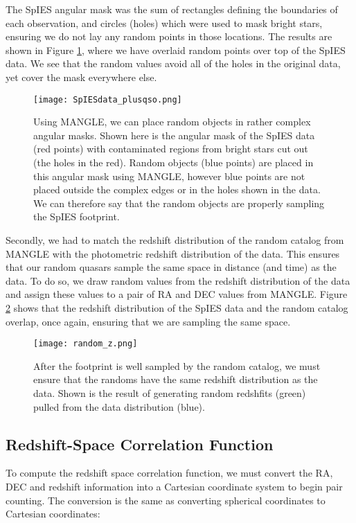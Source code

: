 \documentclass[onecolumn]{emulateapj}
\begin{document}
The SpIES angular mask was the sum of rectangles defining the boundaries of each observation, and circles (holes) which were used to mask bright stars, ensuring we do not lay any random points in those locations. The results are shown in Figure \ref{MANGLE}, where we have overlaid random points over top of the SpIES data. We see that the random values avoid all of the holes in the original data, yet cover the mask everywhere else.

\begin{figure}[!h]
	\centering
	\texttt{[image: SpIESdata\_plusqso.png]}
	\caption{\footnotesize{Using MANGLE, we can place random objects in rather complex angular masks. Shown here is the angular mask of the SpIES data (red points) with contaminated regions from bright stars cut out (the holes in the red). Random objects (blue points) are placed in this angular mask using MANGLE, however blue points are not placed outside the complex edges or in the holes shown in the data. We can therefore say that the random objects are properly sampling the SpIES footprint.}}
	\label{MANGLE}
\end{figure}

Secondly, we had to match the redshift distribution of the random catalog from MANGLE with the photometric redshift distribution of the data. This ensures that our random quasars sample the same space in distance (and time) as the data. To do so, we draw random values from the redshift distribution of the data and assign these values to a pair of RA and DEC values from MANGLE. Figure \ref{randz} shows that the redshift distribution of the SpIES data and the random catalog overlap, once again, ensuring that we are sampling the same space.


\begin{figure}[!h]
	\centering
	\texttt{[image: random\_z.png]}
	\caption{\footnotesize{After the footprint is well sampled by the random catalog, we must ensure that the randoms have the same redshift distribution as the data. Shown is the result of generating random redshfits (green) pulled from the data distribution (blue).}}
	\label{randz}
\end{figure} 



\subsection{Redshift-Space Correlation Function}
To compute the redshift space correlation function, we must convert the RA, DEC and redshift information into a Cartesian coordinate system to begin pair counting. The conversion is the same as converting spherical coordinates to Cartesian coordinates:
\end{document}
